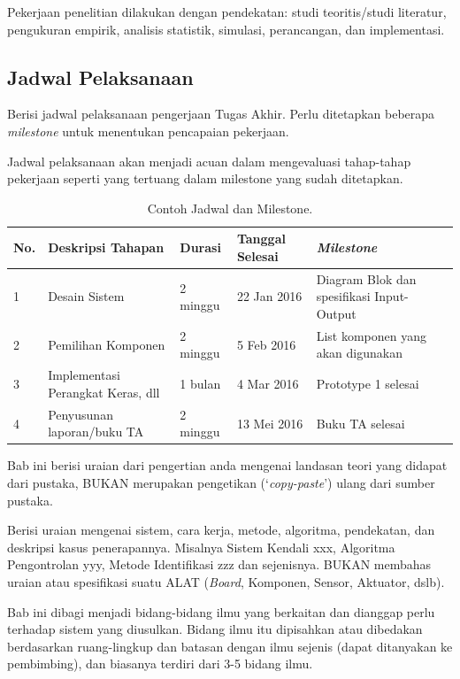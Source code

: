 \documentclass{thesis}
\begin{document}
Pekerjaan penelitian dilakukan dengan pendekatan: studi teoritis/studi literatur, pengukuran empirik, analisis statistik, simulasi, perancangan, dan implementasi.

\subsection{Jadwal Pelaksanaan}

Berisi jadwal pelaksanaan pengerjaan Tugas Akhir. Perlu ditetapkan beberapa \textit{milestone} untuk menentukan pencapaian pekerjaan.

Jadwal pelaksanaan akan menjadi acuan dalam mengevaluasi tahap-tahap pekerjaan seperti yang tertuang dalam milestone yang sudah ditetapkan.

\begin{table}[!ht]
\centering
\caption{Contoh Jadwal dan Milestone.}
\begin{tabular}{|p{5mm}|p{25mm}|p{20mm}|p{20mm}|p{35mm}|} 
 \hline
 \rowcolor{lightgray}
 \textbf{No.} & \textbf{Deskripsi Tahapan} & \textbf{Durasi} & \textbf{Tanggal Selesai} & \textbf{\textit{Milestone}} \\
 \hline
 1 & Desain Sistem & 2 minggu & 22 Jan 2016 & Diagram Blok dan spesifikasi Input-Output \\ 
 \hline
 2 & Pemilihan Komponen & 2 minggu & 5 Feb 2016 & List komponen yang akan digunakan \\
 \hline
 3 & Implementasi Perangkat Keras, dll & 1 bulan & 4 Mar 2016 & Prototype 1 selesai \\
 \hline
 4 & Penyusunan laporan/buku TA & 2 minggu & 13 Mei 2016 & Buku TA selesai \\
 \hline
\end{tabular}
\label{table:1}
\end{table}


Bab ini berisi uraian dari pengertian anda mengenai landasan teori yang didapat dari pustaka, BUKAN merupakan pengetikan (‘\textit{copy-paste}’) ulang dari sumber pustaka.

Berisi uraian mengenai sistem, cara kerja, metode, algoritma, pendekatan, dan deskripsi kasus penerapannya. Misalnya Sistem Kendali xxx, Algoritma Pengontrolan yyy, Metode Identifikasi zzz dan sejenisnya. BUKAN membahas uraian atau spesifikasi suatu ALAT (\textit{Board}, Komponen, Sensor, Aktuator, dslb). 

Bab ini dibagi menjadi bidang-bidang ilmu yang berkaitan dan dianggap perlu terhadap sistem yang diusulkan. Bidang ilmu itu dipisahkan atau dibedakan berdasarkan ruang-lingkup dan batasan dengan ilmu sejenis (dapat ditanyakan ke pembimbing), dan biasanya terdiri dari 3-5 bidang ilmu. 
\end{document}
